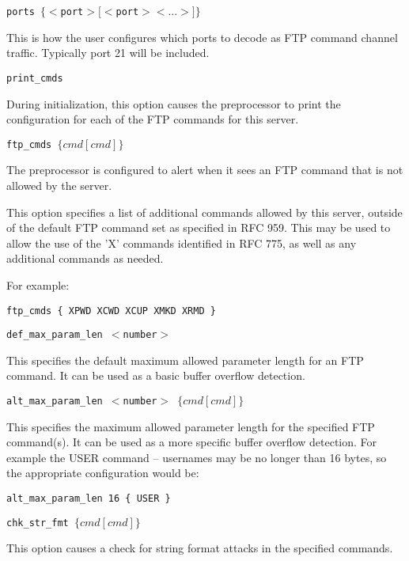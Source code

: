 \documentclass[english]{report}
\newcounter{slistnum}
\newenvironment{slist}
{ \begin{list}{ {\bf \arabic{slistnum}.} }{\usecounter{slistnum} } }
{ \end{list} }
\begin{document}
\begin{slist}
\item \texttt{ports $\{ <$port$> [<$port$> <...>] \}$}

This is how the user configures which ports to decode as FTP command
channel traffic.  Typically port 21 will be included.

\item \texttt{print\_cmds}

During initialization, this option causes the preprocessor to print the
configuration for each of the FTP commands for this server.  

\item \texttt{ftp\_cmds $\{ cmd [cmd] \}$ }

The preprocessor is configured to alert when it sees an FTP command
that is not allowed by the server.

This option specifies a list of additional commands allowed by this server,
outside of the default FTP command set as specified in RFC 959.  This
may be used to allow the use of the 'X' commands identified in RFC 775,
as well as any additional commands as needed.

For example:

\begin{verbatim}
ftp_cmds { XPWD XCWD XCUP XMKD XRMD }
\end{verbatim}

\item \texttt{def\_max\_param\_len $<$number$>$}

This specifies the default maximum allowed parameter length for an
FTP command.  It can be used as a basic buffer overflow detection.

\item \texttt{alt\_max\_param\_len $<$number$>$ $\{ cmd [cmd] \}$}

This specifies the maximum allowed parameter length for the specified
FTP command(s).  It can be used as a more specific buffer overflow
detection.  For example the USER command -- usernames may be no longer
than 16 bytes, so the appropriate configuration would be:

\begin{verbatim}
alt_max_param_len 16 { USER }
\end{verbatim}

\item \texttt{chk\_str\_fmt $\{ cmd [cmd] \}$}

This option causes a check for string format attacks in the specified
commands. 


\end{slist}
\end{document}
